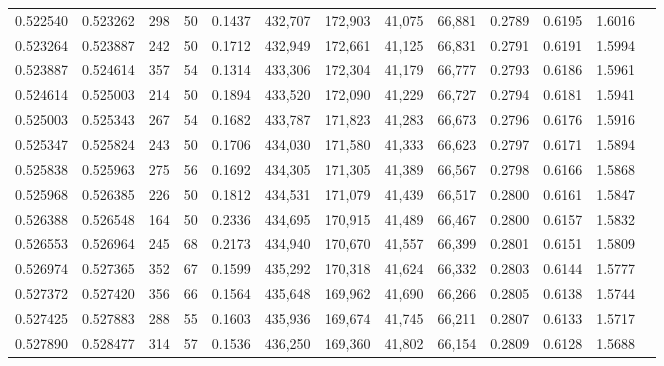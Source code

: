 \begin{tabular}{rrrrrrrrrrrrr}
0.522540 & 0.523262 &   298 &  50 &                                     0.1437 & 432,707 & 172,903 &  41,075 &  66,881 & 0.2789 & 0.6195 & 1.6016 \\
0.523264 & 0.523887 &   242 &  50 &                                     0.1712 & 432,949 & 172,661 &  41,125 &  66,831 & 0.2791 & 0.6191 & 1.5994 \\
0.523887 & 0.524614 &   357 &  54 &                                     0.1314 & 433,306 & 172,304 &  41,179 &  66,777 & 0.2793 & 0.6186 & 1.5961 \\
0.524614 & 0.525003 &   214 &  50 &                                     0.1894 & 433,520 & 172,090 &  41,229 &  66,727 & 0.2794 & 0.6181 & 1.5941 \\
0.525003 & 0.525343 &   267 &  54 &                                     0.1682 & 433,787 & 171,823 &  41,283 &  66,673 & 0.2796 & 0.6176 & 1.5916 \\
0.525347 & 0.525824 &   243 &  50 &                                     0.1706 & 434,030 & 171,580 &  41,333 &  66,623 & 0.2797 & 0.6171 & 1.5894 \\
0.525838 & 0.525963 &   275 &  56 &                                     0.1692 & 434,305 & 171,305 &  41,389 &  66,567 & 0.2798 & 0.6166 & 1.5868 \\
0.525968 & 0.526385 &   226 &  50 &                                     0.1812 & 434,531 & 171,079 &  41,439 &  66,517 & 0.2800 & 0.6161 & 1.5847 \\
0.526388 & 0.526548 &   164 &  50 &                                     0.2336 & 434,695 & 170,915 &  41,489 &  66,467 & 0.2800 & 0.6157 & 1.5832 \\
0.526553 & 0.526964 &   245 &  68 &                                     0.2173 & 434,940 & 170,670 &  41,557 &  66,399 & 0.2801 & 0.6151 & 1.5809 \\
0.526974 & 0.527365 &   352 &  67 &                                     0.1599 & 435,292 & 170,318 &  41,624 &  66,332 & 0.2803 & 0.6144 & 1.5777 \\
0.527372 & 0.527420 &   356 &  66 &                                     0.1564 & 435,648 & 169,962 &  41,690 &  66,266 & 0.2805 & 0.6138 & 1.5744 \\
0.527425 & 0.527883 &   288 &  55 &                                     0.1603 & 435,936 & 169,674 &  41,745 &  66,211 & 0.2807 & 0.6133 & 1.5717 \\
0.527890 & 0.528477 &   314 &  57 &                                     0.1536 & 436,250 & 169,360 &  41,802 &  66,154 & 0.2809 & 0.6128 & 1.5688 \\

\end{tabular}
